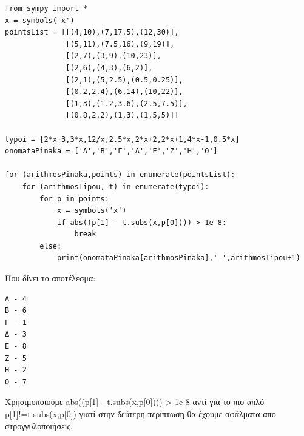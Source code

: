 \begin{lstlisting}
from sympy import *
x = symbols('x')
pointsList = [[(4,10),(7,17.5),(12,30)],
              [(5,11),(7.5,16),(9,19)],
              [(2,7),(3,9),(10,23)],
              [(2,6),(4,3),(6,2)],
              [(2,1),(5,2.5),(0.5,0.25)],
              [(0.2,2.4),(6,14),(10,22)],
              [(1,3),(1.2,3.6),(2.5,7.5)],
              [(0.8,2.2),(1,3),(1.5,5)]]

typoi = [2*x+3,3*x,12/x,2.5*x,2*x+2,2*x+1,4*x-1,0.5*x]
onomataPinaka = ['Α','Β','Γ','Δ','Ε','Ζ','Η','Θ']

for (arithmosPinaka,points) in enumerate(pointsList):
    for (arithmosTipou, t) in enumerate(typoi):
        for p in points:
            x = symbols('x')
            if abs((p[1] - t.subs(x,p[0]))) > 1e-8:
                break
        else:
            print(onomataPinaka[arithmosPinaka],'-',arithmosTipou+1)
\end{lstlisting}

Που δίνει το αποτέλεσμα:

\begin{lstlisting}
Α - 4
Β - 6
Γ - 1
Δ - 3
Ε - 8
Ζ - 5
Η - 2
Θ - 7
\end{lstlisting}

Χρησιμοποιούμε abs((p[1] - t.subs(x,p[0]))) > 1e-8 αντί για το πιο απλό p[1]!=t.subs(x,p[0]) γιατί στην δεύτερη περίπτωση θα έχουμε σφάλματα απο στρογγυλοποιήσεις.